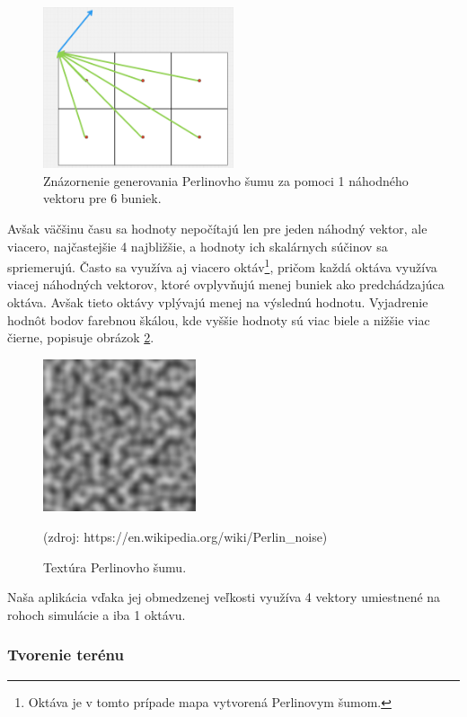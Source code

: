 \documentclass[12pt]{article}
\begin{document}
\begin{figure}[ht]
	\centering
	\includegraphics[width=0.5\textwidth]{res/prelinov_sum.png}
	\caption{Znázornenie generovania Perlinovho šumu za pomoci 1 náhodného
		vektoru pre 6 buniek.}
	\label{obr:perlinov sum}
\end{figure}

Avšak väčšinu času sa hodnoty nepočítajú len pre jeden náhodný vektor,
ale viacero, najčastejšie 4 najbližšie, a hodnoty ich skalárnych súčinov
sa spriemerujú. Často sa využíva aj viacero oktáv\footnote{
	Oktáva je v tomto prípade mapa vytvorená Perlinovym šumom.
}, pričom každá oktáva využíva
viacej náhodných vektorov, ktoré ovplyvňujú menej buniek ako predchádzajúca
oktáva. Avšak tieto oktávy vplývajú menej na výslednú hodnotu. Vyjadrenie hodnôt bodov
farebnou škálou, kde vyššie hodnoty sú viac biele a nižšie viac čierne, popisuje
obrázok \ref{obr:perlinov sum textura}.

\begin{figure}[ht]
	\centering
	\includegraphics[width=0.4\textwidth]{res/perlinov_sum_textura.png}
	\caption{Textúra Perlinovho šumu.}
	\footnotesize (zdroj: https://en.wikipedia.org/wiki/Perlin\_noise)
	\label{obr:perlinov sum textura}
\end{figure}

Naša aplikácia vďaka jej obmedzenej veľkosti využíva 4 vektory umiestnené
na rohoch simulácie a iba 1 oktávu.

\subsubsection{Tvorenie terénu}
\end{document}
